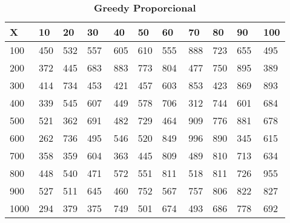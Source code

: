 \documentclass[10pt,letterpaper]{article}
\begin{document}
\begin{center}
\begin{table}\renewcommand{\arraystretch}{2.5}
\caption{\large \textbf{Greedy Proporcional}}
\centering
\begin{tabular} { |m{0.5cm}|m{1.3cm}|m{1.3cm}|m{1.3cm}|m{1.3cm}|m{1.3cm}|m{1.3cm}|m{1.3cm}|m{1.3cm}|m{1.3cm}|m{1.3cm}|} 
\hline
\rowcolor{Gray}
\centering \textbf{X} & \centering \textbf{10} & \centering \textbf{20} & \centering \textbf{30}\ & \centering \textbf{40} & \centering \textbf{50} & \centering \textbf{60}\ & \centering \textbf{70} & \centering \textbf{80} & \centering \textbf{90}\ & \textbf{100} \\\hline
\cellcolor{Gray}100 & \Large 450 & \Large 532 & \Large 557 & \Large 605 & \Large 610 & \Large 555 & \Large 888 & \Large 723 & \Large 655 & \Large 495 \\
\hline
\cellcolor{Gray}200 & \Large 372 & \Large 445 & \Large 683 & \Large 883 & \Large 773 & \Large 804 & \Large 477 & \Large 750 & \Large 895 & \Large 389 \\
\hline
\cellcolor{Gray}300 & \Large 414 & \Large 734 & \Large 453 & \Large 421 & \Large 457 & \Large 603 & \Large 853 & \Large 423 & \Large 869 & \Large 893 \\
\hline
\cellcolor{Gray}400 & \Large 339 & \Large 545 & \Large 607 & \Large 449 & \Large 578 & \Large 706 & \Large 312 & \Large 744 & \Large 601 & \Large 684 \\
\hline
\cellcolor{Gray}500 & \Large 521 & \Large 362 & \Large 691 & \Large 482 & \Large 729 & \Large 464 & \Large 909 & \Large 776 & \Large 881 & \Large 678 \\
\hline
\cellcolor{Gray}600 & \Large 262 & \Large 736 & \Large 495 & \Large 546 & \Large 520 & \Large 849 & \Large 996 & \Large 890 & \Large 345 & \Large 615 \\
\hline
\cellcolor{Gray}700 & \Large 358 & \Large 359 & \Large 604 & \Large 363 & \Large 445 & \Large 809 & \Large 489 & \Large 810 & \Large 713 & \Large 634 \\
\hline
\cellcolor{Gray}800 & \Large 448 & \Large 540 & \Large 471 & \Large 572 & \Large 551 & \Large 811 & \Large 518 & \Large 811 & \Large 726 & \Large 955 \\
\hline
\cellcolor{Gray}900 & \Large 527 & \Large 511 & \Large 645 & \Large 460 & \Large 752 & \Large 567 & \Large 757 & \Large 806 & \Large 822 & \Large 827 \\
\hline
\cellcolor{Gray}1000 & \Large 294 & \Large 379 & \Large 375 & \Large 749 & \Large 501 & \Large 674 & \Large 493 & \Large 686 & \Large 778 & \Large 692 \\
\hline
\end{tabular} \\
\end{table}
\end{center}
\end{document}
